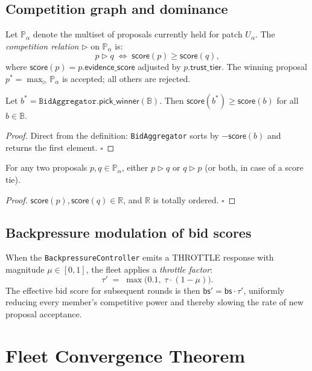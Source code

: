 \documentclass[11pt]{article}
\providecommand{\BidSet}{\mathbb{B}}               %
\providecommand{\compete}{\rhd}                    %
\providecommand{\throttlefactor}{\tau}             %
\providecommand{\score}{\mathsf{score}}            %
\providecommand{\Props}{\mathbb{P}}                 %
\providecommand{\AggPY}{\texttt{BidAggregator}}
\providecommand{\BPCtrlPY}{\texttt{BackpressureController}}
\begin{document}
\subsection{Competition graph and dominance}

Let $\Props_\alpha$ denote the multiset of proposals currently held for patch
$U_\alpha$.  The \emph{competition relation} $\compete$ on $\Props_\alpha$ is:
\[
  p \compete q
  \;\iff\;
  \score(p) \geq \score(q),
\]
where $\score(p) = p.\mathsf{evidence\_score}$ adjusted by $p.\mathsf{trust\_tier}$.
The winning proposal $p^* = \max_\compete \Props_\alpha$ is accepted; all
others are rejected.

\begin{proposition}\label{prop:winner-ub}
Let $b^* = \AggPY{}.\mathsf{pick\_winner}(\BidSet)$.  Then
$\score(b^*) \geq \score(b)$ for all $b \in \BidSet$.
\end{proposition}
\begin{proof}
Direct from the definition: \AggPY{} sorts by $-\score(b)$ and returns
the first element. \hfill$\square$
\end{proof}

\begin{proposition}\label{prop:compete-total}
For any two proposals $p, q \in \Props_\alpha$, either $p \compete q$ or
$q \compete p$ (or both, in case of a score tie).
\end{proposition}
\begin{proof}
$\score(p), \score(q) \in \mathbb{R}$, and $\mathbb{R}$ is totally ordered.
\hfill$\square$
\end{proof}

\subsection{Backpressure modulation of bid scores}

When the \BPCtrlPY{} emits a THROTTLE response with magnitude $\mu \in [0,1]$,
the fleet applies a \emph{throttle factor}:
\[
  \throttlefactor' \;=\; \max\bigl(0.1,\; \throttlefactor \cdot (1 - \mu)\bigr).
\]
The effective bid score for subsequent rounds is then
$\mathsf{bs}' = \mathsf{bs} \cdot \throttlefactor'$, uniformly reducing every
member's competitive power and thereby slowing the rate of new proposal
acceptance.

\section{Fleet Convergence Theorem}\label{sec:convergence}
\end{document}
